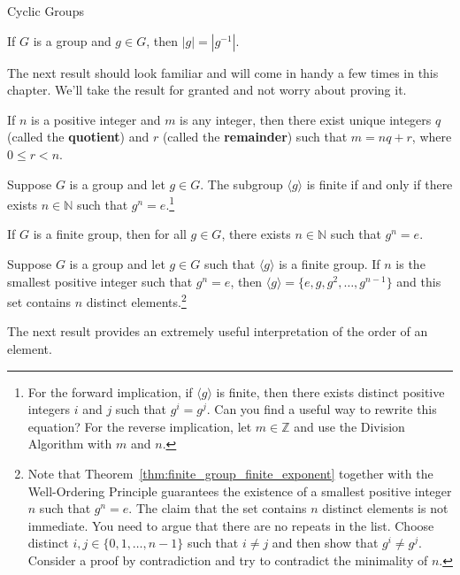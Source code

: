 \begin{section}{Cyclic Groups}
\begin{theorem}
If $G$ is a group and $g\in G$, then $|g|=|g^{-1}|$.
\end{theorem}

The next result should look familiar and will come in handy a few times in this chapter. We'll take the result for granted and not worry about proving it.

\begin{theorem}
If $n$ is a positive integer and $m$ is any integer, then there exist unique integers $q$ (called the \textbf{quotient}) and $r$ (called the \textbf{remainder}) such that $m=nq+r$, where $0\leq r<n$.
\end{theorem}

\begin{theorem}\label{thm:finite_group_finite_exponent}
Suppose $G$ is a group and let $g\in G$. The subgroup $\langle g\rangle$ is finite if and only if there exists $n\in\mathbb{N}$ such that $g^n=e$.\footnote{For the forward implication, if $\langle g\rangle$ is finite, then there exists distinct positive integers $i$ and $j$ such that $g^i=g^j$.  Can you find a useful way to rewrite this equation? For the reverse implication, let $m\in\mathbb{Z}$ and use the Division Algorithm with $m$ and $n$.}
\end{theorem}

\begin{corollary}\label{cor:finite_group_finite_exponent}
If $G$ is a finite group, then for all $g\in G$, there exists $n\in\mathbb{N}$ such that $g^n=e$.
\end{corollary}

\begin{theorem}
Suppose $G$ is a group and let $g\in G$ such that $\langle g\rangle$ is a finite group. If $n$ is the smallest positive integer such that $g^n=e$, then $\langle g\rangle = \{e, g, g^2, \ldots, g^{n-1}\}$ and this set contains $n$ distinct elements.\footnote{Note that Theorem~\ref{thm:finite_group_finite_exponent} together with the Well-Ordering Principle guarantees the existence of a smallest positive integer $n$ such that $g^n=e$. The claim that the set contains $n$ distinct elements is not immediate.  You need to argue that there are no repeats in the list. Choose distinct $i,j\in\{0,1,\ldots,n-1\}$ such that $i\neq j$ and then show that $g^i\neq g^j$.  Consider a proof by contradiction and try to contradict the minimality of $n$.}
\end{theorem}

The next result provides an extremely useful interpretation of the order of an element.


\end{section}
